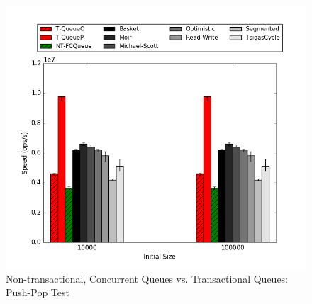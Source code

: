 \begin{figure}[H]
    \centering
    \includegraphics[width=\textwidth]{concurrent/allQ:PushPop.png}
    \caption{Non-transactional, Concurrent Queues vs. Transactional Queues: Push-Pop Test}
\end{figure}


